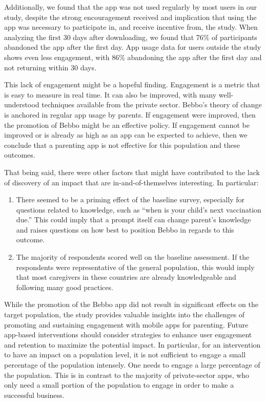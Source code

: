 Additionally, we found that the app was not used regularly by most users in our study, despite the strong encouragement received and implication that using the app was necessary to participate in, and receive incentive from, the study. When analyzing the first 30 days after downloading, we found that 76\% of participants abandoned the app after the first day. App usage data for users outside the study shows even less engagement, with 86\% abandoning the app after the first day and not returning within 30 days.

This lack of engagement might be a hopeful finding. Engagement is a metric that is easy to measure in real time. It can also be improved, with many well-understood techniques available from the private sector. Bebbo’s theory of change is anchored in regular app usage by parents. If engagement were improved, then the promotion of Bebbo might be an effective policy. If engagement cannot be improved or is already as high as an app can be expected to achieve, then we conclude that a parenting app is not effective for this population and these outcomes.

That being said, there were other factors that might have contributed to the lack of discovery of an impact that are in-and-of-themselves interesting. In particular:

\begin{enumerate}
\item There seemed to be a priming effect of the baseline survey, especially for questions related to knowledge, such as “when is your child’s next vaccination due.” This could imply that a prompt itself can change parent’s knowledge and raises questions on how best to position Bebbo in regards to this outcome.
\item The majority of respondents scored well on the baseline assessment. If the respondents were representative of the general population, this would imply that most caregivers in these countries are already knowledgeable and following many good practices.
\end{enumerate}

While the promotion of the Bebbo app did not result in significant effects on the target population, the study provides valuable insights into the challenges of promoting and sustaining engagement with mobile apps for parenting. Future app-based interventions should consider strategies to enhance user engagement and retention to maximize the potential impact. In particular, for an intervention to have an impact on a population level, it is not sufficient to engage a small percentage of the population intensely. One needs to engage a large percentage of the population. This is in contrast to the majority of private-sector apps, who only need a small portion of the population to engage in order to make a successful business.

